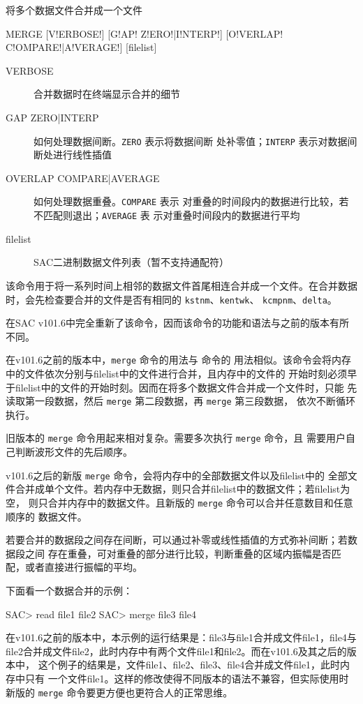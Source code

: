 \label{cmd:merge}

将多个数据文件合并成一个文件

\begin{SACSTX}
MERGE [V!ERBOSE!] [G!AP! Z!ERO!|I!NTERP!] [O!VERLAP! C!OMPARE!|A!VERAGE!] [filelist]
\end{SACSTX}

\begin{description}
\item [VERBOSE] 合并数据时在终端显示合并的细节
\item [GAP ZERO|INTERP] 如何处理数据间断。\texttt{ZERO} 表示将数据间断
    处补零值；\texttt{INTERP} 表示对数据间断处进行线性插值
\item [OVERLAP COMPARE|AVERAGE] 如何处理数据重叠。\texttt{COMPARE} 表示
    对重叠的时间段内的数据进行比较，若不匹配则退出；\texttt{AVERAGE} 表
    示对重叠时间段内的数据进行平均
\item [filelist] SAC二进制数据文件列表（暂不支持通配符）
\end{description}

该命令用于将一系列时间上相邻的数据文件首尾相连合并成一个文件。在合并数据
时，会先检查要合并的文件是否有相同的 \texttt{kstnm}、\texttt{kentwk}、
\texttt{kcmpnm}、\texttt{delta}。

在SAC v101.6中完全重新了该命令，因而该命令的功能和语法与之前的版本有所
不同。

在v101.6之前的版本中，\texttt{merge} 命令的用法与  命令的
用法相似。该命令会将内存中的文件依次分别与filelist中的文件进行合并，且内存中的文件的
开始时刻必须早于filelist中的文件的开始时刻。因而在将多个数据文件合并成一个文件时，只能
先读取第一段数据，然后 \texttt{merge} 第二段数据，再 \texttt{merge} 第三段数据，
依次不断循环执行。

旧版本的 \texttt{merge} 命令用起来相对复杂。需要多次执行 \texttt{merge} 命令，且
需要用户自己判断波形文件的先后顺序。

v101.6之后的新版 \texttt{merge} 命令，会将内存中的全部数据文件以及filelist中的
全部文件合并成单个文件。若内存中无数据，则只合并filelist中的数据文件；若filelist为空，
则只合并内存中的数据文件。且新版的 \texttt{merge} 命令可以合并任意数目和任意顺序的
数据文件。

若要合并的数据段之间存在间断，可以通过补零或线性插值的方式弥补间断；若数据段之间
存在重叠，可对重叠的部分进行比较，判断重叠的区域内振幅是否匹配，或者直接进行振幅的平均。

下面看一个数据合并的示例：
\begin{SACCode}
SAC> read file1 file2
SAC> merge file3 file4
\end{SACCode}
在v101.6之前的版本中，本示例的运行结果是：file3与file1合并成文件file1，file4与
file2合并成文件file2，此时内存中有两个文件file1和file2。而在v101.6及其之后的版本中，
这个例子的结果是，文件file1、file2、file3、file4合并成文件file1，此时内存中只有
一个文件file1。这样的修改使得不同版本的语法不兼容，但实际使用时新版的 \texttt{merge}
命令要更方便也更符合人的正常思维。

